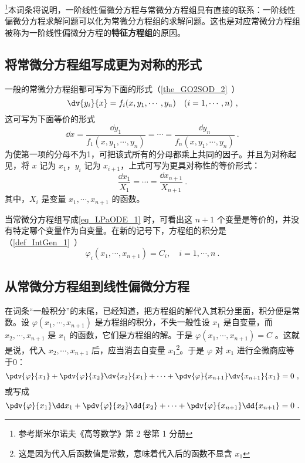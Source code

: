 \footnote{参考斯米尔诺夫《高等数学》第 2 卷第 1 分册}本词条将说明，一阶线性偏微分方程与常微分方程组具有直接的联系：一阶线性偏微分方程求解问题可以化为常微分方程组的求解问题。这也是对应常微分方程组被称为一阶线性偏微分方程的\textbf{特征方程组}的原因。
\subsection{将常微分方程组写成更为对称的形式}
一般的常微分方程组都可写为下面的形式（\autoref{the_GO2SOD_2}~）
\begin{equation}\label{eq_LPaODE_4}
\dv{y_i}{x}=f_i(x,y_1,\cdots,y_n) \quad (i=1,\cdots,n)~,
\end{equation}
这可写为下面等价的形式
\begin{equation}
\dd x=\frac{\dd y_1}{f_1(x,y_1,\cdots,y_n)}=\cdots=\frac{\dd y_n}{f_n(x,y_1,\cdots,y_n)}~.
\end{equation}
为使第一项的分母不为1，可把该式所有的分母都乘上共同的因子。并且为对称起见，将 $x$ 记为 $x_1$，$y_i$ 记为 $x_{i+1}$，上式可写为更具对称性的等价形式：
\begin{equation}\label{eq_LPaODE_1}
\frac{\dd x_1}{X_1}=\cdots=\frac{\dd x_{n+1}}{X_{n+1}}~.
\end{equation}
其中，$X_i$ 是变量 $x_1,\cdots,x_{n+1}$ 的函数。

当常微分方程组写成\autoref{eq_LPaODE_1} 时，可看出这 $n+1$ 个变量是等价的，并没有特定哪个变量作为自变量。在新的记号下，方程组的积分是（\autoref{def_IntGen_1}~）
\begin{equation}
\varphi_i(x_1,\cdots,x_{n+1})=C_i,\quad i=1,\cdots,n~.
\end{equation}
\subsection{从常微分方程组到线性偏微分方程}
在词条“一般积分”的末尾，已经知道，把方程组的解代入其积分里面，积分便是常数。设 $\varphi(x_1,\cdots,x_{n+1})$ 是方程组的积分，不失一般性设 $x_1$ 是自变量，而 $x_2,\cdots,x_{n+1}$ 是 $x_1$ 的函数，它们是方程组的解。于是 $\varphi(x_1,\cdots,x_{n+1})=C$ 。这就是说，代入 $x_2,\cdots,x_{n+1}$ 后，应当消去自变量 $x_1$\footnote{这是因为代入后函数值是常数，意味着代入后的函数不显含 $x_1$}。于是 $\varphi$ 对 $x_1$ 进行全微商应等于0：
\begin{equation}
\pdv{\varphi}{x_1}+\pdv{\varphi}{x_2}\dv{x_2}{x_1}+\cdots+\pdv{\varphi}{x_{n+1}}\dv{x_{n+1}}{x_1}=0~,
\end{equation}
或写成
\begin{equation}\label{eq_LPaODE_2}
\pdv{\varphi}{x_1}\dd x_1+\pdv{\varphi}{x_2}\dd{x_2}+\cdots+\pdv{\varphi}{x_{n+1}}\dd{x_{n+1}}=0~.
\end{equation}

